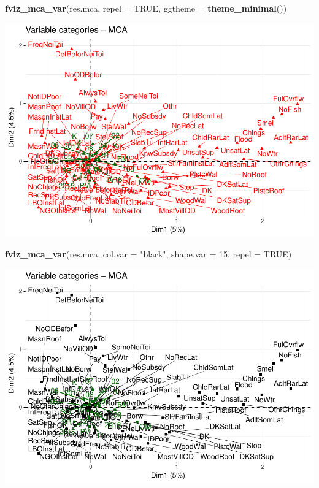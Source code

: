 \documentclass[11pt,]{article}
\newenvironment{Shaded}{\begin{snugshade}}{\end{snugshade}}
\newcommand{\DataTypeTok}[1]{\textcolor[rgb]{0.13,0.29,0.53}{#1}}
\newcommand{\DecValTok}[1]{\textcolor[rgb]{0.00,0.00,0.81}{#1}}
\newcommand{\KeywordTok}[1]{\textcolor[rgb]{0.13,0.29,0.53}{\textbf{#1}}}
\newcommand{\NormalTok}[1]{#1}
\newcommand{\OtherTok}[1]{\textcolor[rgb]{0.56,0.35,0.01}{#1}}
\newcommand{\StringTok}[1]{\textcolor[rgb]{0.31,0.60,0.02}{#1}}
\begin{document}
\begin{Shaded}
\begin{Highlighting}[]
\KeywordTok{fviz_mca_var}\NormalTok{(res.mca, }\DataTypeTok{repel =} \OtherTok{TRUE}\NormalTok{, }\DataTypeTok{ggtheme =} \KeywordTok{theme_minimal}\NormalTok{())}
\end{Highlighting}
\end{Shaded}

\includegraphics{describe_FSMintentions_regional_seasonal_iDE-Camb_surveysOct2017_files/figure-latex/MCA_results-4.pdf}

\begin{Shaded}
\begin{Highlighting}[]
\KeywordTok{fviz_mca_var}\NormalTok{(res.mca, }\DataTypeTok{col.var =} \StringTok{"black"}\NormalTok{, }\DataTypeTok{shape.var =} \DecValTok{15}\NormalTok{, }\DataTypeTok{repel =} \OtherTok{TRUE}\NormalTok{)}
\end{Highlighting}
\end{Shaded}

\includegraphics{describe_FSMintentions_regional_seasonal_iDE-Camb_surveysOct2017_files/figure-latex/MCA_results-5.pdf}
\end{document}
